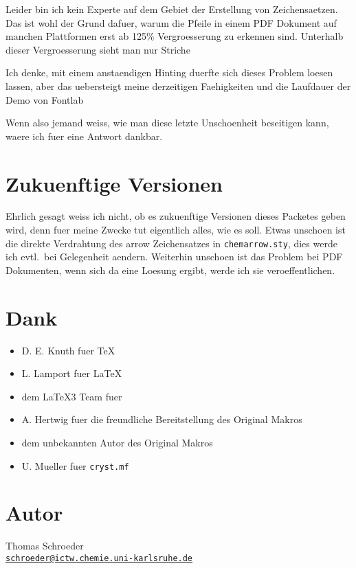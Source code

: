 \documentclass[german, DIV=9, pagesize=auto]{scrartcl}
\newcommand*{\mail}[1]{\href{mailto:#1}{\texttt{#1}}}
\newcommand*{\pkg}[1]{\textsf{#1}}
\begin{document}
Leider bin ich kein Experte auf dem Gebiet der Erstellung von Zeichensaetzen. 
Das ist wohl der Grund dafuer, warum die Pfeile in einem PDF Dokument auf 
manchen Plattformen erst ab 125\% Vergroesserung zu erkennen sind. Unterhalb 
dieser Vergroesserung sieht man nur Striche \frownie

Ich denke, mit einem anstaendigen Hinting duerfte sich dieses Problem loesen 
lassen, aber das uebersteigt meine derzeitigen Faehigkeiten und die 
Laufdauer der Demo von Fontlab \smiley

Wenn also jemand weiss, wie man diese letzte Unschoenheit beseitigen kann, 
waere ich fuer eine Antwort dankbar.


\section{Zukuenftige Versionen}

Ehrlich gesagt weiss ich nicht, ob es zukuenftige Versionen dieses Packetes 
geben wird, denn fuer meine Zwecke tut eigentlich alles, wie es soll. Etwas 
unschoen ist die direkte Verdrahtung des \pkg{arrow} Zeichensatzes in 
\texttt{chemarrow.sty}, dies werde ich evtl.\ bei Gelegenheit aendern. Weiterhin 
unschoen ist das Problem bei PDF Dokumenten, wenn sich da eine Loesung 
ergibt, werde ich sie veroeffentlichen.


\section{Dank}

\begin{itemize}
\item D. E. Knuth fuer \TeX
\item L. Lamport fuer \LaTeX\
\item dem \LaTeX3 Team fuer \LaTeXe
\item A. Hertwig fuer die freundliche Bereitstellung des Original Makros
\item dem unbekannten Autor des Original Makros
\item U. Mueller fuer \texttt{cryst.mf}
\end{itemize}


\section{Autor}

Thomas Schroeder\\
\mail{schroeder@ictw.chemie.uni-karlsruhe.de}
\end{document}
